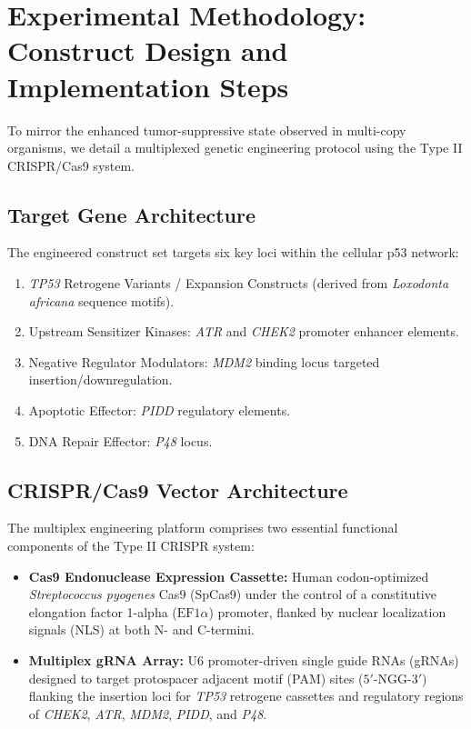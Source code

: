 \documentclass[11pt,a4paper]{article}
\begin{document}
\section{Experimental Methodology: Construct Design and Implementation Steps}

To mirror the enhanced tumor-suppressive state observed in multi-copy organisms, we detail a multiplexed genetic engineering protocol using the Type II CRISPR/Cas9 system.

\subsection{Target Gene Architecture}
The engineered construct set targets six key loci within the cellular p53 network:
\begin{enumerate}
    \item \textit{TP53} Retrogene Variants / Expansion Constructs (derived from \textit{Loxodonta africana} sequence motifs).
    \item Upstream Sensitizer Kinases: \textit{ATR} and \textit{CHEK2} promoter enhancer elements.
    \item Negative Regulator Modulators: \textit{MDM2} binding locus targeted insertion/downregulation.
    \item Apoptotic Effector: \textit{PIDD} regulatory elements.
    \item DNA Repair Effector: \textit{P48} locus.
\end{enumerate}

\subsection{CRISPR/Cas9 Vector Architecture}
The multiplex engineering platform comprises two essential functional components of the Type II CRISPR system:
\begin{itemize}
    \item \textbf{Cas9 Endonuclease Expression Cassette:} Human codon-optimized \textit{Streptococcus pyogenes} Cas9 (SpCas9) under the control of a constitutive elongation factor 1-alpha ($\text{EF1}\alpha$) promoter, flanked by nuclear localization signals (NLS) at both N- and C-termini.
    \item \textbf{Multiplex gRNA Array:} U6 promoter-driven single guide RNAs (gRNAs) designed to target protospacer adjacent motif (PAM) sites ($5' \text{-NGG-} 3'$) flanking the insertion loci for \textit{TP53} retrogene cassettes and regulatory regions of \textit{CHEK2}, \textit{ATR}, \textit{MDM2}, \textit{PIDD}, and \textit{P48}.
\end{itemize}
\end{document}
